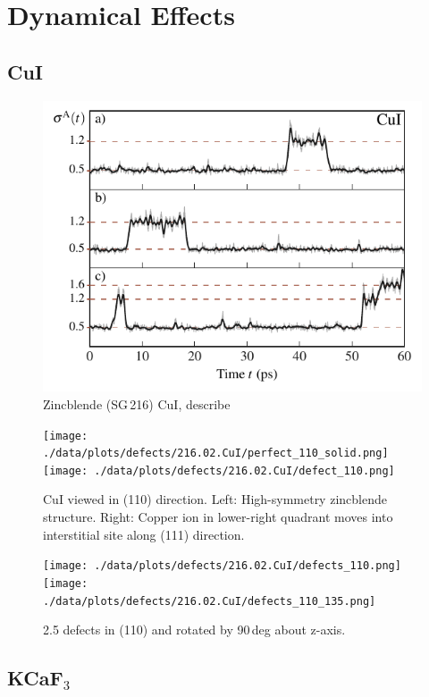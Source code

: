 \documentclass[nobib,a4paper,twoside,notoc,justified,marginals=justified]{tufte-book}
\begin{document}
\section{Dynamical Effects}

\subsection{CuI}

\begin{figure}
	\includegraphics[width=\textwidth]{./data/plots/defects/216.02.CuI/sigma_vs_time.pdf}
	\caption{Zincblende (SG\,216) CuI, describe}
	\label{}
\end{figure}

\begin{figure}
	\texttt{[image: ./data/plots/defects/216.02.CuI/perfect\_110\_solid.png]} \hfill
	\texttt{[image: ./data/plots/defects/216.02.CuI/defect\_110.png]}
	\caption{CuI viewed in (110) direction. Left: High-symmetry zincblende structure. Right: Copper ion in lower-right quadrant moves into interstitial site along (111) direction.}
	\label{}
\end{figure}

\begin{figure}
	\texttt{[image: ./data/plots/defects/216.02.CuI/defects\_110.png]} \hfill
	\texttt{[image: ./data/plots/defects/216.02.CuI/defects\_110\_135.png]}
	\caption{2.5 defects in (110) and rotated by 90\,deg about z-axis.}
	\label{}
\end{figure}

\subsection{KCaF$_3$}
\end{document}
